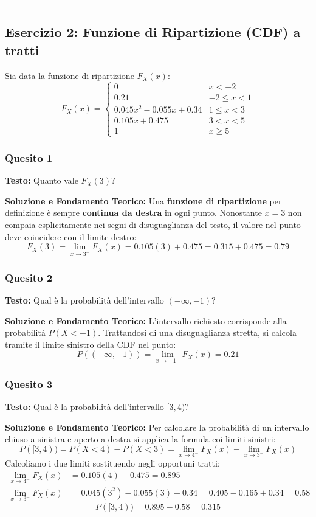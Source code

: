 \documentclass[12pt, a4paper]{article}
\begin{document}
\vspace{0.5cm}\hrule\vspace{0.5cm}

\subsection*{Esercizio 2: Funzione di Ripartizione (CDF) a tratti}
Sia data la funzione di ripartizione $F_X(x)$:
$$
F_X(x) = 
\begin{cases} 
0 & x < -2 \\
0.21 & -2 \le x < 1 \\
0.045x^2 - 0.055x + 0.34 & 1 \le x < 3 \\
0.105x + 0.475 & 3 < x < 5 \\
1 & x \ge 5
\end{cases}
$$

\subsubsection*{Quesito 1}
\textbf{Testo:} Quanto vale $F_X(3)$?

\textbf{Soluzione e Fondamento Teorico:} 
Una \textbf{funzione di ripartizione} per definizione è sempre \textbf{continua da destra} in ogni punto. Nonostante $x=3$ non compaia esplicitamente nei segni di disuguaglianza del testo, il valore nel punto deve coincidere con il limite destro:
$$ F_X(3) = \lim_{x \to 3^+} F_X(x) = 0.105(3) + 0.475 = 0.315 + 0.475 = 0.79 $$

\subsubsection*{Quesito 2}
\textbf{Testo:} Qual è la probabilità dell'intervallo $(-\infty, -1)$?

\textbf{Soluzione e Fondamento Teorico:} 
L'intervallo richiesto corrisponde alla probabilità $P(X < -1)$. Trattandosi di una disuguaglianza stretta, si calcola tramite il limite sinistro della CDF nel punto:
$$ P((-\infty, -1)) = \lim_{x \to -1^-} F_X(x) = 0.21 $$

\subsubsection*{Quesito 3}
\textbf{Testo:} Qual è la probabilità dell'intervallo $[3, 4)$?

\textbf{Soluzione e Fondamento Teorico:} 
Per calcolare la probabilità di un intervallo chiuso a sinistra e aperto a destra si applica la formula coi limiti sinistri:
$$ P([3, 4)) = P(X < 4) - P(X < 3) = \lim_{x \to 4^-} F_X(x) - \lim_{x \to 3^-} F_X(x) $$
Calcoliamo i due limiti sostituendo negli opportuni tratti:
\begin{align*}
\lim_{x \to 4^-} F_X(x) &= 0.105(4) + 0.475 = 0.895 \\
\lim_{x \to 3^-} F_X(x) &= 0.045(3^2) - 0.055(3) + 0.34 = 0.405 - 0.165 + 0.34 = 0.58
\end{align*}
$$ P([3, 4)) = 0.895 - 0.58 = 0.315 $$
\end{document}
